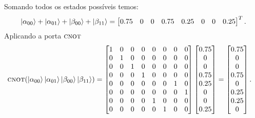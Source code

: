 Somando todos os estados possíveis temos:
\begin{equation}
  \ket{\alpha_{00}}+\ket{\alpha_{01}}+\ket{\beta_{00}}+\ket{\beta_{11}} =
  \begin{bmatrix} \num{0.75} & 0 & 0 & \num{0.75} & \num{0.25} & 0 & 0 & \num{0.25} \end{bmatrix}^T.
\end{equation}
Aplicando a porta \(\operatorname{\textsc{cnot}}\)
\begin{equation}
  \begin{split}
    \operatorname{\textsc{cnot}} (\ket{\alpha_{00}}\ket{\alpha_{01}}\ket{\beta_{00}}\ket{\beta_{11}}) &=
    \begin{bmatrix}
    1 & 0 & 0 & 0 & 0 & 0 & 0 & 0 \\
    0 & 1 & 0 & 0 & 0 & 0 & 0 & 0 \\
    0 & 0 & 1 & 0 & 0 & 0 & 0 & 0 \\
    0 & 0 & 0 & 1 & 0 & 0 & 0 & 0 \\
    0 & 0 & 0 & 0 & 0 & 0 & 1 & 0 \\
    0 & 0 & 0 & 0 & 0 & 0 & 0 & 1 \\
    0 & 0 & 0 & 0 & 1 & 0 & 0 & 0 \\
    0 & 0 & 0 & 0 & 0 & 1 & 0 & 0
    \end{bmatrix}
    \begin{bmatrix} \num{0.75} \\ 0 \\ 0 \\ \num{0.75} \\ \num{0.25} \\ 0 \\ 0 \\ \num{0.25} \end{bmatrix} =
    \begin{bmatrix} \num{0.75} \\ 0 \\ 0 \\ \num{0.75} \\ 0 \\ \num{0.25} \\ \num{0.25} \\ 0 \end{bmatrix}.
  \end{split}
\end{equation}

